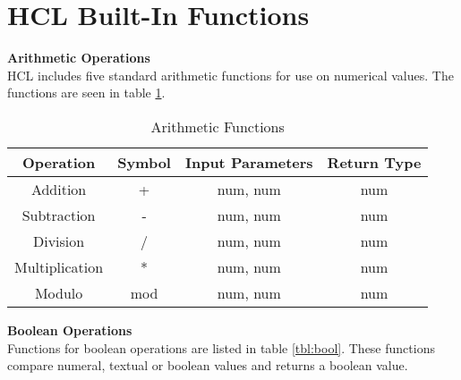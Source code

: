 \section{HCL Built-In Functions}
\label{builtinAppend}
\textbf{Arithmetic Operations}\\
HCL includes five standard arithmetic functions for use on numerical values.
The functions are seen in table \ref{tbl:arith}.

\begin{table}[h]
	\centering
	\caption{Arithmetic Functions}
	\label{tbl:arith}
	\begin{tabular}{|c|c|c|c|}
		\hline
		Operation      & Symbol & Input Parameters & Return Type \\ \hline
		Addition       & +      & num, num         & num         \\ \hline
		Subtraction    & -      & num, num         & num         \\ \hline
		Division       & /      & num, num         & num         \\ \hline
		Multiplication & *      & num, num         & num         \\ \hline
		Modulo         & mod    & num, num         & num         \\ \hline
	\end{tabular}
\end{table}

\textbf{Boolean Operations}\\
Functions for boolean operations are listed in table \ref{tbl:bool}.
These functions compare numeral, textual or boolean values and returns a boolean value.

